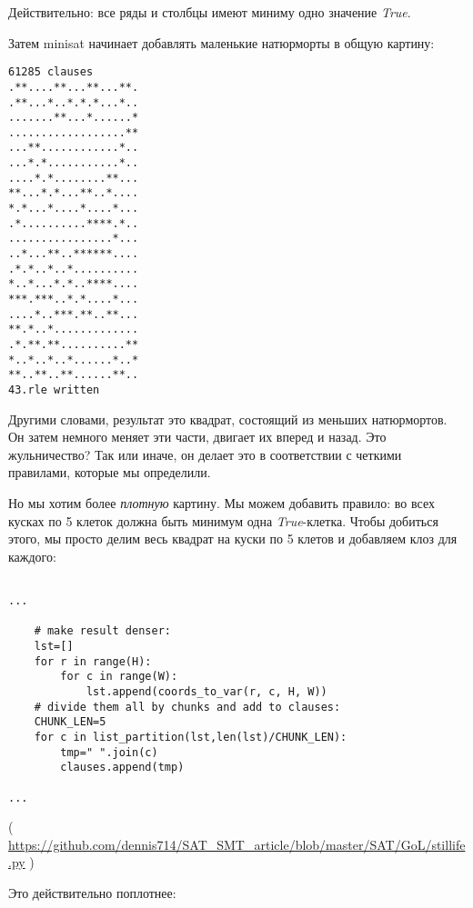 Действительно: все ряды и столбцы имеют миниму одно значение \textit{True}.

Затем minisat начинает добавлять маленькие натюрморты в общую картину:

\begin{lstlisting}
61285 clauses
.**....**...**...**.
.**...*..*.*.*...*..
.......**...*......*
..................**
...**............*..
...*.*...........*..
....*.*........**...
**...*.*...**..*....
*.*...*....*....*...
.*..........****.*..
................*...
..*...**..******....
.*.*..*..*..........
*..*...*.*..****....
***.***..*.*....*...
....*..***.**..**...
**.*..*.............
.*.**.**..........**
*..*..*..*......*..*
**..**..**......**..
43.rle written
\end{lstlisting}

Другими словами, результат это квадрат, состоящий из меньших натюрмортов.
Он затем немного меняет эти части, двигает их вперед и назад.
Это жульничество?
Так или иначе, он делает это в соответствии с четкими правилами, которые мы определили.

Но мы хотим более \textit{плотную} картину. Мы можем добавить правило: во всех кусках по 5 клеток должна быть
минимум одна \textit{True}-клетка.
Чтобы добиться этого, мы просто делим весь квадрат на куски по 5 клетов и добавляем клоз для каждого:

\begin{lstlisting}

...

    # make result denser:
    lst=[]
    for r in range(H):
        for c in range(W):
            lst.append(coords_to_var(r, c, H, W))
    # divide them all by chunks and add to clauses:
    CHUNK_LEN=5
    for c in list_partition(lst,len(lst)/CHUNK_LEN):
        tmp=" ".join(c)
        clauses.append(tmp)

...

\end{lstlisting}

( \url{https://github.com/dennis714/SAT_SMT_article/blob/master/SAT/GoL/stillife.py} )

Это действительно поплотнее:

